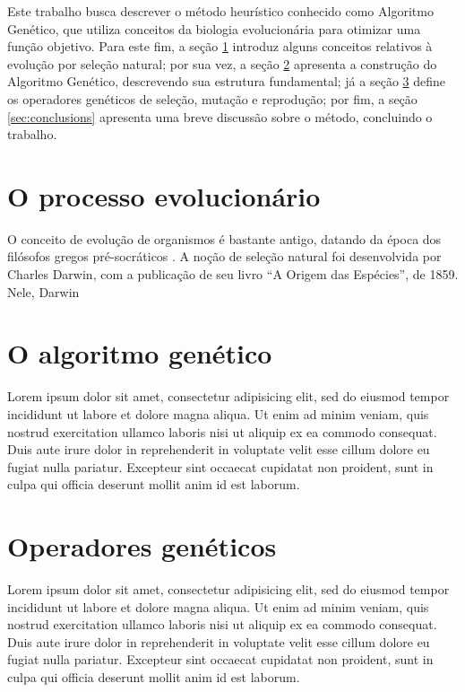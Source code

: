 \documentclass[12pt]{article}
\begin{document}
Este trabalho busca descrever o método heurístico conhecido como Algoritmo Genético, que utiliza conceitos da biologia evolucionária para otimizar uma função objetivo. Para este fim, a seção \ref{sec:evolution} introduz alguns conceitos relativos à evolução por seleção natural; por sua vez, a seção \ref{sec:algorithm} apresenta a construção do Algoritmo Genético, descrevendo sua estrutura fundamental; já a seção \ref{sec:operators} define os operadores genéticos de seleção, mutação e reprodução; por fim, a seção \ref{sec:conclusions} apresenta uma breve discussão sobre o método, concluindo o trabalho.

\section{O processo evolucionário} \label{sec:evolution}

O conceito de evolução de organismos é bastante antigo, datando da época dos filósofos gregos pré-socráticos \cite{Hull1967}. A noção de seleção natural  foi desenvolvida por Charles Darwin, com a publicação de seu livro ``A Origem das Espécies'', de 1859. Nele, Darwin 

\section{O algoritmo genético} \label{sec:algorithm}

Lorem ipsum dolor sit amet, consectetur adipisicing elit, sed do eiusmod tempor incididunt ut labore et dolore magna aliqua. Ut enim ad minim veniam, quis nostrud exercitation ullamco laboris nisi ut aliquip ex ea commodo consequat. Duis aute irure dolor in reprehenderit in voluptate velit esse cillum dolore eu fugiat nulla pariatur. Excepteur sint occaecat cupidatat non proident, sunt in culpa qui officia deserunt mollit anim id est laborum.

\section{Operadores genéticos} \label{sec:operators}

Lorem ipsum dolor sit amet, consectetur adipisicing elit, sed do eiusmod tempor incididunt ut labore et dolore magna aliqua. Ut enim ad minim veniam, quis nostrud exercitation ullamco laboris nisi ut aliquip ex ea commodo consequat. Duis aute irure dolor in reprehenderit in voluptate velit esse cillum dolore eu fugiat nulla pariatur. Excepteur sint occaecat cupidatat non proident, sunt in culpa qui officia deserunt mollit anim id est laborum.
\end{document}
